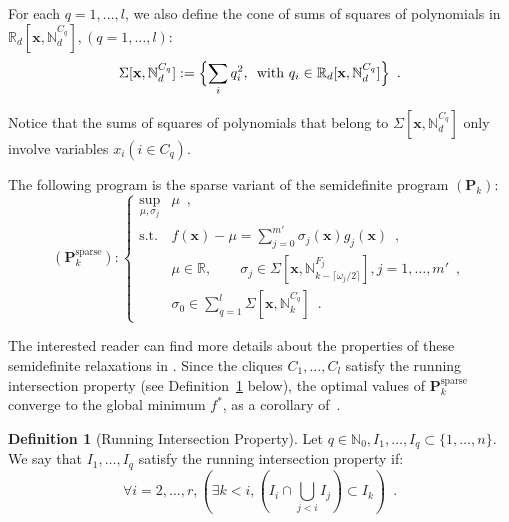 \documentclass[a4paper,10pt]{article}
\newcommand{\mons}[2]{\N_{#1}^{#2}}
\newcommand{\R}{\mathbb{R}}
\newcommand{\N}{\mathbb{N}}
\newcommand{\x}{\mathbf{x}}
\def\P{\mathbf{P}}
\theoremstyle{plain}
\theoremstyle{definition}
\newtheorem{definition}[theorem]{Definition}
\theoremstyle{remark}
\begin{document}
For each $q=1 ,\dots,l$, we also define the cone of sums of squares of polynomials in $\R_d[\x, \mons{d}{C_q}], (q=1 ,\dots,l)$:
\begin{equation}
\label{eq:cone_sos_sparse}
\Sigma [\x, \mons{d}{C_q}] := \Bigl\{\sum_i q_i^2, \, \text{ with } q_i \in \R_d[\x, \mons{d}{C_q}] \Bigr\}\enspace.
\end{equation}

Notice that the sums of squares of polynomials that belong to $\Sigma [\x, \mons{d}{C_q}]$ only involve variables $x_i (i \in C_q)$. 

The following program is the sparse variant of the semidefinite program $(\P_k)$:
\[
(\P^{\text{sparse}}_k):\left\{			
\begin{array}{ll}
\sup_{\mu, \sigma_j} & \mu\enspace, \\			 
\text{s.t.} & f (\x) - \mu = \sum\limits_{j = 0}^{m'} \sigma_j(\x) g_j(\x)\enspace, \\
& \mu\in \R,\qquad \sigma_j \in \Sigma[\x, \mons{k - \lceil \omega_j / 2 \rceil }{F_j}], j = 1,\dots,m' \enspace,\\
& \sigma_0 \in \sum\limits_{q = 1}^l \Sigma [\x, \mons{k}{C_q}]\enspace.
\end{array} \right.
\]

The interested reader can find more details about the properties of these semidefinite relaxations in \cite{Waki06SparseSOS}. Since the cliques $C_1, \dots, C_l$ satisfy the running intersection property (see Definition~\ref{def:rip} below), the optimal values of $\P_k^{\text{sparse}}$ converge to the global minimum $f^*$, as a corollary of~\cite[Theorem 3.6]{Las06SparseSOS}.

\begin{definition}[Running Intersection Property]
\label{def:rip}
Let $q \in \N_0, I_1, \dots, I_q \subset \{1, \dots, n\}$. We say that $I_1, \dots, I_q$ satisfy the running intersection property if: 
\[ \forall i = 2, \dots, r, (\exists k < i, (I_i \cap \bigcup\limits_{j < i} I_j) \subset I_k)\enspace. \]
\end{definition}
\end{document}
